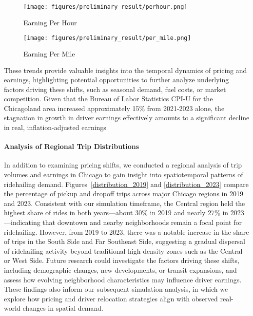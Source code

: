 \begin{figure}[h]
  \centering
  \texttt{[image: figures/preliminary\_result/perhour.png]}
  \caption{Earning Per Hour}
  \label{by_hour}
\end{figure}

\begin{figure}[h]
  \centering
  \texttt{[image: figures/preliminary\_result/per\_mile.png]}
  \caption{Earning Per Mile}
  \label{by_mile}
\end{figure}

These trends provide valuable insights into the temporal dynamics of pricing and earnings, highlighting potential opportunities to further analyze underlying factors driving these shifts, such as seasonal demand, fuel costs, or market competition.
Given that the Bureau of Labor Statistics CPI-U for the Chicagoland area increased approximately 15\% from 2021-2023 alone, the stagnation in growth in driver earnings effectively amounts to a significant decline in real, inflation-adjusted earnings \cite{}

\paragraph{Analysis of Regional Trip Distributions}
In addition to examining pricing shifts, we conducted a regional analysis of trip volumes and earnings in Chicago to gain insight into spatiotemporal patterns of ridehailing demand. Figures~\ref{distribution_2019} and \ref{distribution_2023} compare the percentage of pickup and dropoff trips across major Chicago regions in 2019 and 2023. Consistent with our simulation timeframe, the Central region held the highest share of rides in both years---about 30\% in 2019 and nearly 27\% in 2023---indicating that downtown and nearby neighborhoods remain a focal point for ridehailing. However, from 2019 to 2023, there was a notable increase in the share of trips in the South Side and Far Southeast Side, suggesting a gradual dispersal of ridehailing activity beyond traditional high-density zones such as the Central or West Side. Future research could investigate the factors driving these shifts, including demographic changes, new developments, or transit expansions, and assess how evolving neighborhood characteristics may influence driver earnings. These findings also inform our subsequent simulation analysis, in which we explore how pricing and driver relocation strategies align with observed real-world changes in spatial demand.


